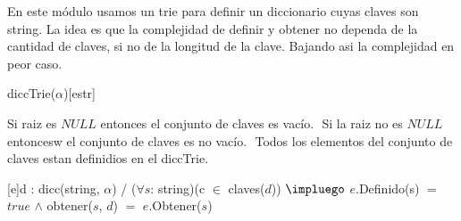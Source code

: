 \begin{Representacion}
  
  
	En este m\'odulo usamos un trie para definir un diccionario cuyas claves son string.
$ $\newline La idea es que la complejidad de definir y obtener no dependa de la cantidad de claves, si no de la longitud de la clave. Bajando asi la complejidad en peor caso.  
  
  \begin{Estructura}{diccTrie($\alpha$)}[estr]
    \begin{Tupla}[estr]
    \end{Tupla}

    \begin{Tupla}[nodo]
    \end{Tupla}
  \end{Estructura}


Si raiz es $NULL$ entonces el conjunto de claves es vac\'io. $ $\newline
Si la raiz no es $NULL$ entoncesw el conjunto de claves es no vac\'io. $ $\newline
Todos los elementos del conjunto de claves estan definidios en el diccTrie.
$ $\newline
 
 
  [e]{d : dicc(string, $\alpha$) / ($\forall s$: string)(c $\in$ claves($d$)) $\impluego$ $e$.Definido(s) $=$ $true$ $\land$ obtener($s$, $d$) $=$ $e$.Obtener($s$) }



\end{Representacion}

